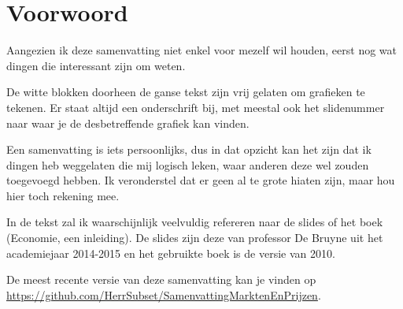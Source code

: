 \section*{Voorwoord}
Aangezien ik deze samenvatting niet enkel voor mezelf wil houden, eerst nog wat dingen die interessant zijn om weten.

De witte blokken doorheen de ganse tekst zijn vrij gelaten om grafieken te tekenen. Er staat altijd een onderschrift bij, met meestal ook het slidenummer naar waar je de desbetreffende grafiek kan vinden.

Een samenvatting is iets persoonlijks, dus in dat opzicht kan het zijn dat ik dingen heb weggelaten die mij logisch leken, waar anderen deze wel zouden toegevoegd hebben. Ik veronderstel dat er geen al te grote hiaten zijn, maar hou hier toch rekening mee.

In de tekst zal ik waarschijnlijk veelvuldig refereren naar de slides of het boek (Economie, een inleiding). De slides zijn deze van professor De Bruyne uit het academiejaar 2014-2015 en het gebruikte boek is de versie van 2010.

De meest recente versie van deze samenvatting kan je vinden op \url{https://github.com/HerrSubset/SamenvattingMarktenEnPrijzen}.
